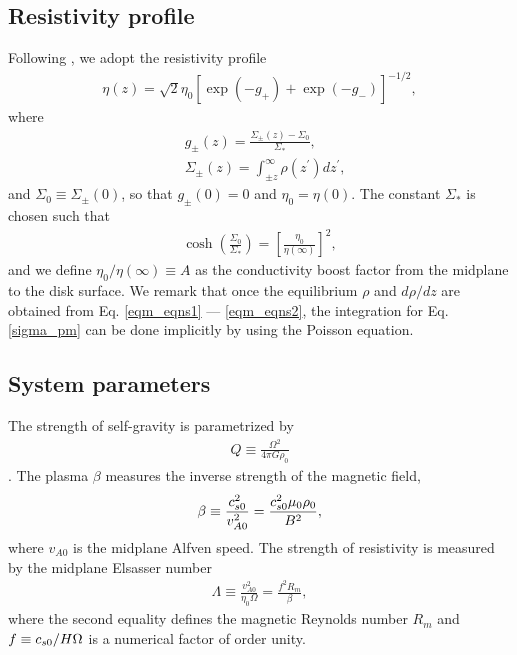 \subsection{Resistivity profile}
Following \cite{fleming03}, we adopt the resistivity profile
\begin{align}
  \eta(z) =
  \sqrt{2}\eta_0\left[\exp{\left(-g_+\right)}+\exp{\left(-g_-\right)}\right]^{-1/2},  
\end{align}
where
\begin{align}
  &g_\pm(z) =  \frac{\Sigma_\pm(z)-\Sigma_0}{\Sigma_*}, \\
  &\Sigma_\pm(z) = \int_{\pm z}^\infty\rho(z^\prime)dz^\prime, \label{sigma_pm}
\end{align}
and $\Sigma_0\equiv\Sigma_{\pm}(0)$, so that $g_\pm(0)=0$ and $\eta_0 
= \eta(0)$. The constant $\Sigma_*$ is chosen such that 
\begin{align}
  \cosh{\left(\frac{\Sigma_0}{\Sigma_*}\right)} =
  \left[\frac{\eta_0}{\eta(\infty)}\right]^2,
\end{align}
and we define $\eta_0/\eta(\infty)\equiv A$ as the conductivity
boost factor from the midplane to the disk surface. We remark that
once the equilibrium $\rho$ and $d\rho/dz$ are obtained from
Eq. \ref{eqm_eqns1} --- \ref{eqm_eqns2}, the integration for
Eq. \ref{sigma_pm} can be done implicitly by using the Poisson
equation. 

\subsection{System parameters}
The strength of self-gravity is parametrized by
\begin{align}
  Q \equiv \frac{\Omega^2}{4\pi G\rho_0}
\end{align}
\citep{mamat10}. The plasma $\beta$ measures the inverse strength of
the magnetic field,
\begin{align}
  \beta \equiv \frac{c_{s0}^2}{v_{A0}^2} =
  \frac{c_{s0}^2\mu_0\rho_0}{B^2},  
\end{align}
where $v_{A0}$ is the midplane Alfven speed. The strength of
resistivity is measured by the midplane Elsasser number 
\begin{align}
  \Lambda \equiv \frac{v_{A0}^2}{\eta_0\Omega} = \frac{f^2 R_m}{\beta}, 
\end{align}
where the second equality defines the magnetic Reynolds number $R_m$
and $f\equiv c_{s0}/H\Omega$ is a numerical factor of order unity.  



